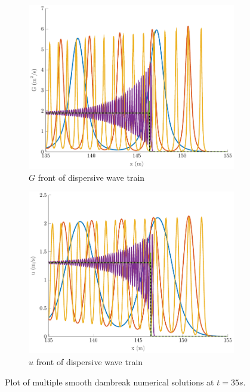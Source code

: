 \documentclass[10pt]{article}
\begin{document}
\begin{figure}
\begin{subfigure}{0.32\textwidth}
		\includegraphics[width=\textwidth]{./Figures/Simulations/Study/Serre2SWWECloser/GFront.pdf}
		\caption{$G$ front of dispersive wave train}
	\end{subfigure}
	\begin{subfigure}{0.32\textwidth}
		\centering
		\includegraphics[width=\textwidth]{./Figures/Simulations/Study/Serre2SWWECloser/uFront.pdf}
		\caption{$u$ front of dispersive wave train}
	\end{subfigure}
	\caption{Plot of multiple smooth dambreak numerical solutions at $t=35s$.}
\end{figure}
\end{document}

